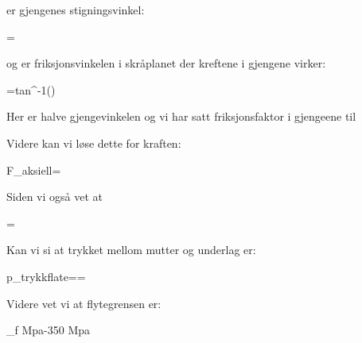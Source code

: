\varphi er gjengenes stigningsvinkel:

\varphi =

og \varepsilon er friksjonsvinkelen i skråplanet der kreftene i gjengene virker:

\varepsilon =tan^{-1}()

Her er \alpha halve gjengevinkelen og vi har satt friksjonsfaktor i gjengeene til  %

Videre kan vi løse dette for kraften:

F_{aksiell}=

Siden vi også vet at

\sigma=

Kan vi si at trykket mellom mutter og underlag er:

p_{trykkflate}==

Videre vet vi at flytegrensen er:


\sigma _{f} Mpa-350 Mpa